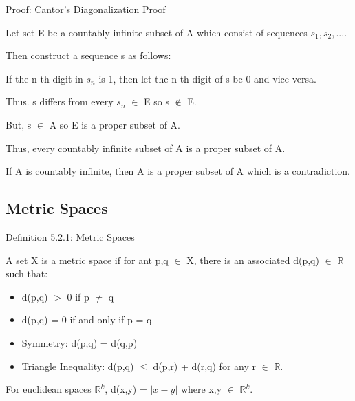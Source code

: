 { \color{magenta} \underline{Proof: Cantor's Diagonalization Proof} } 

	Let set E be a countably infinite subset of A which consist of sequences $s_1,s_2,...$.

	Then construct a sequence s as follows:

	\qquad If the n-th digit in $s_n$ is 1, then let the n-th digit of s be 0
	and vice versa.

	Thus. s differs from every $s_n$ $\in$ E so s $\not \in$ E.

	But, s $\in$ A so E is a proper subset of A.

	Thus, every countably infinite subset of A is a proper subset of A.

	If A is countably infinite, then A is a proper subset of A which
	is a contradiction.





\subsection{ Metric Spaces }

{ \color{blue} Definition 5.2.1: Metric Spaces } 

	\begin{adjustbox}{minipage=14cm, right}
		A set X is a metric space if for ant p,q $\in$ X, there is an associated d(p,q) $\in$
		$\mathbb{R}$ such that:	
		\begin{itemize}[leftmargin=1cm, itemsep=0.4em]
			\item d(p,q) $>$ 0 \qquad \qquad if p $\neq$ q
			
			\item d(p,q) = 0 if and only if p = q
			
			\item {\color{lblue} Symmetry}:
				d(p,q) = d(q,p)
			
			\item {\color{lblue} Triangle Inequality}:
				d(p,q) $\leq$ d(p,r) + d(r,q) \qquad \qquad for any r $\in$ $\mathbb{R}$.
		\end{itemize}

		For euclidean spaces $\mathbb{R}^k$, d(x,y) = $| x - y |$ where x,y $\in$ $\mathbb{R}^k$. \\
	\end{adjustbox}

